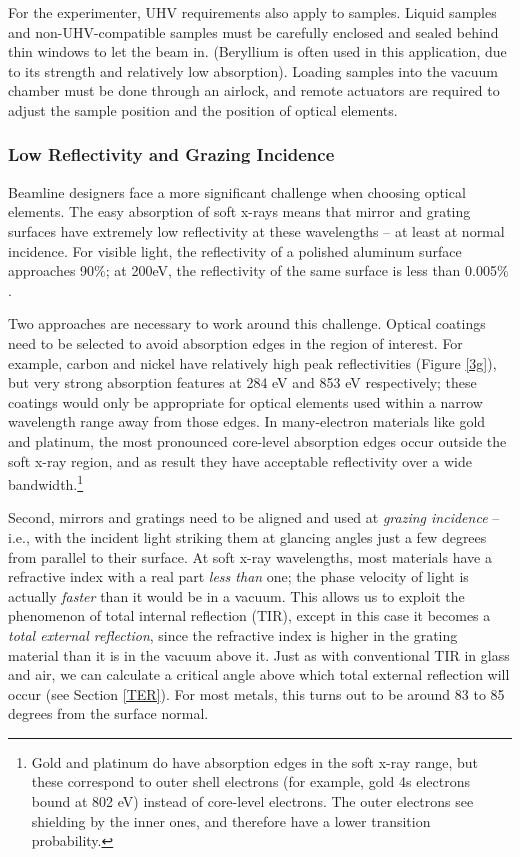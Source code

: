 For the experimenter, UHV requirements also apply to samples.  Liquid samples and non-UHV-compatible samples must be carefully enclosed and sealed behind thin windows to let the beam in. (Beryllium is often used in this application, due to its strength and relatively low absorption).  Loading samples into the vacuum chamber must be done through an airlock, and remote actuators are required to adjust the sample position and the position of optical elements.

\subsubsection{Low Reflectivity and Grazing Incidence}
Beamline designers face a more significant challenge when choosing optical elements.  The easy absorption of soft x-rays means that mirror and grating surfaces have extremely low reflectivity at these wavelengths -- at least at normal incidence.  For visible light, the reflectivity of a polished aluminum surface approaches 90\%; at 200eV, the reflectivity of the same surface is less than 0.005\% \cite{CXR11}.

Two approaches are necessary to work around this challenge.  Optical coatings need to be selected to avoid absorption edges in the region of interest.  For example, carbon and nickel have relatively high peak reflectivities (Figure \ref{3g}), but very strong absorption features at 284 eV and 853 eV respectively; these coatings would only be appropriate for optical elements used within a narrow wavelength range away from those edges.  In many-electron materials like gold and platinum, the most pronounced core-level absorption edges occur outside the soft x-ray region, and as result they have acceptable reflectivity over a wide bandwidth.\footnote{Gold and platinum do have absorption edges in the soft x-ray range, but these correspond to outer shell electrons (for example, gold 4s electrons bound at 802 eV) instead of core-level electrons. The outer electrons see shielding by the inner ones, and therefore have a lower transition probability.}

\label{TER-intro}
Second, mirrors and gratings need to be aligned and used at \emph{grazing incidence} -- i.e., with the incident light striking them at glancing angles just a few degrees from parallel to their surface.  At soft x-ray wavelengths, most materials have a refractive index with a real part \emph{less than} one; the phase velocity of light is actually \emph{faster} than it would be in a vacuum.  This allows us to exploit the phenomenon of total internal reflection (TIR), except in this case it becomes a \emph{total external reflection}, since the refractive index is higher in the grating material than it is in the vacuum above it.  Just as with conventional TIR in glass and air, we can calculate a critical angle above which total external reflection will occur (see Section \ref{TER}).  For most metals, this turns out to be around 83 to 85 degrees from the surface normal.

